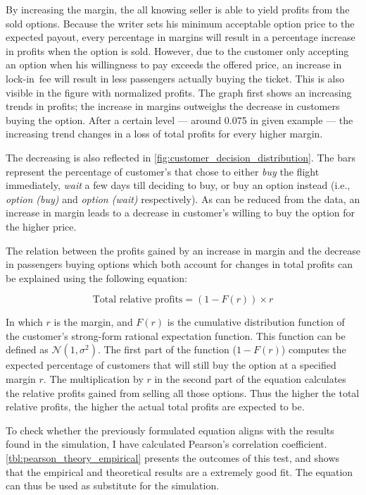 
By increasing the margin, the all knowing seller is able to yield profits from the sold options. Because the writer sets his minimum acceptable option price to the expected payout, every percentage in margins will result in a percentage increase in profits when the option is sold. However, due to the customer only accepting an option when his willingness to pay exceeds the offered price, an increase in lock-in~fee will result in less passengers actually buying the ticket. This is also visible in the figure with normalized profits. The graph first shows an increasing trends in profits; the increase in margins outweighs the decrease in customers buying the option. After a certain level --- around 0.075 in given example --- the increasing trend changes in a loss of total profits for every higher margin.

The decreasing is also reflected in \autoref{fig:customer_decision_distribution}. The bars represent the percentage of customer's that chose to either \emph{buy} the flight immediately, \emph{wait} a few days till deciding to buy, or buy an option instead (i.e., \emph{option (buy)} and \emph{option (wait)} respectively). As can be reduced from the data, an increase in margin leads to a decrease in customer's willing to buy the option for the higher price.


The relation between the profits gained by an increase in margin and the decrease in passengers buying options which both account for changes in total profits can be explained using the following equation:

$$ \mbox{Total relative profits} = (1 - F(r)) \times r $$

In which $r$ is the margin, and $F(r)$ is the cumulative distribution function of the customer's strong-form rational expectation function. This function can be defined as $\mathcal{N}(1, \sigma^2)$. The first part of the function ($1 - F(r)$) computes the expected percentage of customers that will still buy the option at a specified margin $r$. The multiplication by $r$ in the second part of the equation calculates the relative profits gained from selling all those options. Thus the higher the total relative profits, the higher the actual total profits are expected to be.

To check whether the previously formulated equation aligns with the results found in the simulation, I have calculated Pearson's correlation coefficient. \autoref{tbl:pearson_theory_empirical} presents the outcomes of this test, and shows that the empirical and theoretical results are a extremely good fit. The equation can thus be used as substitute for the simulation.

